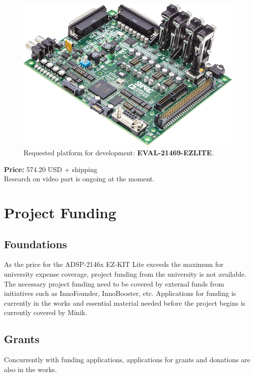 \begin{figure}[H]
\centering
\includegraphics[scale=0.4]{./pictures/ADZS.png}
\caption{Requested platform for development: \textbf{EVAL-21469-EZLITE}.}
\label{fig:ADZS.png}
\end{figure}

\textbf{Price:} 574.20 USD + shipping \\ 

Research on video part is ongoing at the moment.

\section{Project Funding}
\subsection{Foundations}
As the price for the ADSP-2146x EZ-KIT Lite exceeds the maximum for university expense coverage, project funding from the university is not available. The necessary project funding need to be covered by external funds from initiatives such as InnoFounder, InnoBooster, etc. Applications for funding is currently in the works and essential material needed before the project begins is currently covered by Minik. \\

\subsection{Grants}
Concurrently with funding applications, applications for grants and donations are also in the works. \\


